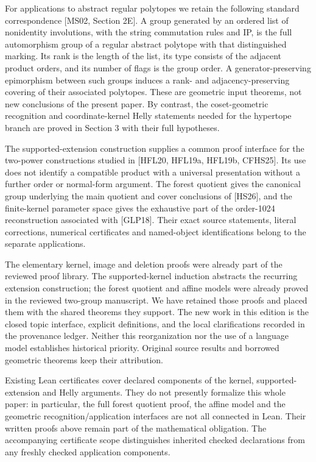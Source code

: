 \documentclass[
  11pt,
  a4paper,
]{article}
\begin{document}
For applications to abstract regular polytopes we retain the following
standard correspondence {[}MS02, Section 2E{]}. A group generated by an
ordered list of nonidentity involutions, with the string commutation
rules and IP, is the full automorphism group of a regular abstract
polytope with that distinguished marking. Its rank is the length of the
list, its type consists of the adjacent product orders, and its number
of flags is the group order. A generator-preserving epimorphism between
such groups induces a rank- and adjacency-preserving covering of their
associated polytopes. These are geometric input theorems, not new
conclusions of the present paper. By contrast, the coset-geometric
recognition and coordinate-kernel Helly statements needed for the
hypertope branch are proved in Section 3 with their full hypotheses.

The supported-extension construction supplies a common proof interface
for the two-power constructions studied in {[}HFL20, HFL19a, HFL19b,
CFHS25{]}. Its use does not identify a compatible product with a
universal presentation without a further order or normal-form argument.
The forest quotient gives the canonical group underlying the main
quotient and cover conclusions of {[}HS26{]}, and the finite-kernel
parameter space gives the exhaustive part of the order-1024
reconstruction associated with {[}GLP18{]}. Their exact source
statements, literal corrections, numerical certificates and named-object
identifications belong to the separate applications.

The elementary kernel, image and deletion proofs were already part of
the reviewed proof library. The supported-kernel induction abstracts the
recurring extension construction; the forest quotient and affine models
were already proved in the reviewed two-group manuscript. We have
retained those proofs and placed them with the shared theorems they
support. The new work in this edition is the closed topic interface,
explicit definitions, and the local clarifications recorded in the
provenance ledger. Neither this reorganization nor the use of a language
model establishes historical priority. Original source results and
borrowed geometric theorems keep their attribution.

Existing Lean certificates cover declared components of the kernel,
supported-extension and Helly arguments. They do not presently formalize
this whole paper: in particular, the full forest quotient proof, the
affine model and the geometric recognition/application interfaces are
not all connected in Lean. Their written proofs above remain part of the
mathematical obligation. The accompanying certificate scope
distinguishes inherited checked declarations from any freshly checked
application components.
\end{document}

